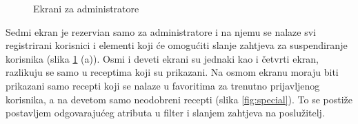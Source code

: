 \documentclass[times, utf8, zavrsni]{fer}
\begin{document}
\begin{figure}[h]
      \centering
      \caption{Ekrani za administratore}
      \label{fig:Single recipe}
\end{figure}\newpage
Sedmi ekran je rezervian samo za administratore i na njemu se nalaze svi registrirani korisnici
i elementi koji će omogućiti slanje zahtjeva za suspendiranje korisnika (slika \ref*{fig:Single recipe} (a)).
Osmi i deveti ekrani su jednaki kao i četvrti ekran, razlikuju se samo u receptima koji su prikazani.
Na osmom ekranu moraju biti prikazani samo recepti koji se nalaze u favoritima za trenutno prijavljenog korisnika, a na devetom
samo neodobreni recepti (slika \ref{fig:special}).
To se postiže postavljem odgovarajućeg atributa u filter i slanjem zahtjeva na poslužitelj.
\end{document}
